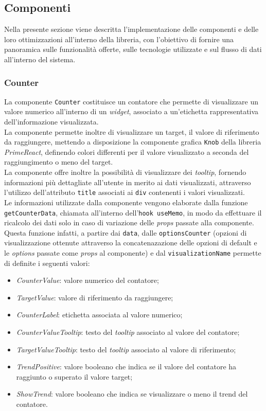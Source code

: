 \subsection{Componenti}
Nella presente sezione viene descritta l'implementazione delle componenti e delle loro ottimizzazioni all'interno della libreria,
con l'obiettivo di fornire una panoramica sulle funzionalità offerte, sulle tecnologie utilizzate e sul flusso di dati all'interno del sistema.

\subsubsection{Counter}
La componente \texttt{Counter} costituisce un contatore che permette di visualizzare un valore numerico all'interno di un \textit{widget}, associato a un'etichetta
rappresentativa dell'informazione visualizzata. \\
La componente permette inoltre di visualizzare un target, il valore di riferimento da raggiungere, mettendo a disposizione la componente grafica \texttt{Knob}
della libreria \textit{PrimeReact}, definendo colori differenti per il valore visualizzato a seconda del raggiungimento o meno del target. \\
La componente offre inoltre la possibilità di visualizzare dei \textit{tooltip}, fornendo informazioni più dettagliate all'utente
in merito ai dati visualizzati, attraverso l'utilizzo dell'attributo \texttt{title} associati ai \texttt{div} contenenti i valori visualizzati. \\
Le informazioni utilizzate dalla componente vengono elaborate dalla funzione \\
\texttt{getCounterData}, chiamata all'interno dell'\texttt{hook useMemo}, in modo da
effettuare il ricalcolo dei dati solo in caso di variazione delle \textit{props} passate alla componente. Questa funzione infatti, a partire dai \texttt{data}, dalle \texttt{optionsCounter}
(opzioni di visualizzazione ottenute attraverso la concatenazazione delle opzioni di default e le \textit{options} passate come \textit{props} al componente) e dal \texttt{visualizationName}
permette di definite i seguenti valori:
\begin{itemize}
    \item \textit{CounterValue}: valore numerico del contatore;
    \item \textit{TargetValue}: valore di riferimento da raggiungere;
    \item \textit{CounterLabel}: etichetta associata al valore numerico;
    \item \textit{CounterValueTooltip}: testo del \textit{tooltip} associato al valore del contatore;
    \item \textit{TargetValueTooltip}: testo del \textit{tooltip} associato al valore di riferimento;
    \item \textit{TrendPositive}: valore booleano che indica se il valore del contatore ha raggiunto o superato il valore target;
    \item \textit{ShowTrend}: valore booleano che indica se visualizzare o meno il trend del contatore.
\end{itemize}
